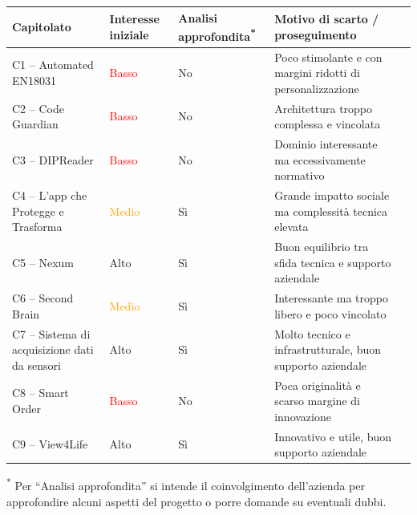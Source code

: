 \documentclass[a4paper,11pt]{article}
\begin{document}
{\footnotesize
\begin{tabularx}{\textwidth}{
|>{\raggedright\arraybackslash}p{1.6cm}|
>{\raggedright\arraybackslash}p{2.3cm}|
>{\raggedright\arraybackslash}p{2cm}|
X|
>{\raggedright\arraybackslash}p{2.3cm}|}
\hline
\rowcolor{primaryblue!40}
\textbf{\color{white} Capitolato} &
\textbf{\color{white} Interesse iniziale} &
\textbf{\color{white} Analisi approfondita\textsuperscript{*}} &
\textbf{\color{white} Motivo di scarto / proseguimento} \\
\hline

\rowcolor{secondaryblue!10}
C1 – Automated EN18031 & \textcolor{red}{Basso} & No &
Poco stimolante e con margini ridotti di personalizzazione \\
\hline

\rowcolor{secondaryblue!10}
C2 – Code Guardian & \textcolor{red}{Basso} & No &
Architettura troppo complessa e vincolata \\
\hline

\rowcolor{secondaryblue!10}
C3 – DIPReader & \textcolor{red}{Basso} & No &
Dominio interessante ma eccessivamente normativo \\
\hline

\rowcolor{secondaryblue!10}
C4 – L'app che Protegge e Trasforma & \textcolor{orange}{Medio} & Sì &
Grande impatto sociale ma complessità tecnica elevata \\
\hline

\rowcolor{secondaryblue!10}
C5 – Nexum & \textcolor{green!60!black}{Alto} & Sì &
Buon equilibrio tra sfida tecnica e supporto aziendale \\
\hline

\rowcolor{secondaryblue!10}
C6 – Second Brain & \textcolor{orange}{Medio} & Sì &
Interessante ma troppo libero e poco vincolato \\
\hline

\rowcolor{secondaryblue!10}
C7 – Sistema di acquisizione dati da sensori & \textcolor{green!60!black}{Alto} & Sì &
Molto tecnico e infrastrutturale, buon supporto aziendale \\
\hline

\rowcolor{secondaryblue!10}
C8 – Smart Order & \textcolor{red}{Basso} & No &
Poca originalità e scarso margine di innovazione \\
\hline

\rowcolor{secondaryblue!10}
C9 – View4Life & \textcolor{green!60!black}{Alto} & Sì &
Innovativo e utile, buon supporto aziendale \\
\hline
\end{tabularx}
}

\textsuperscript{*} Per ``Analisi approfondita'' si intende il coinvolgimento dell'azienda per approfondire alcuni aspetti del progetto o porre domande su eventuali dubbi.
\end{document}
